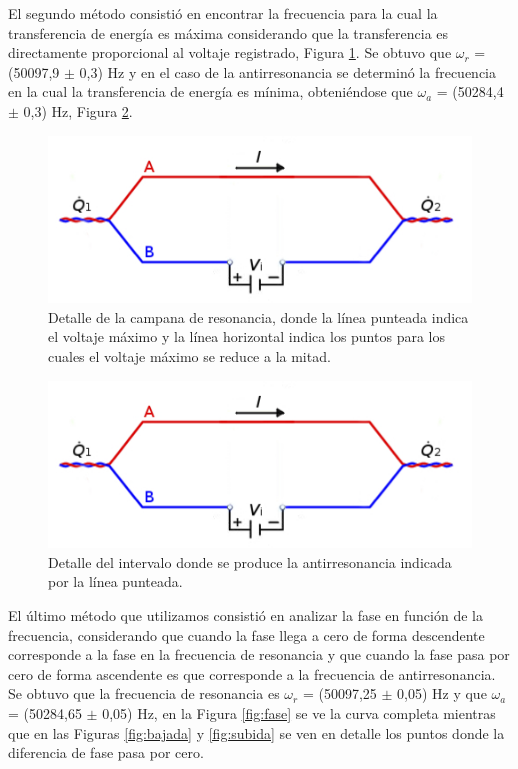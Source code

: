 \documentclass[twoside,twocolumn,a4paper]{article}
\begin{document}
El segundo m\'etodo consisti\'o en encontrar la frecuencia para la cual la transferencia de energ\'ia es m\'axima considerando que la transferencia es directamente proporcional al voltaje registrado,  Figura \ref{fig:detalleRESamp}. Se obtuvo que $\omega_{r}$ = (50097,9 $\pm$ 0,3) Hz y en el caso de la antirresonancia se determin\'o la frecuencia en la cual la transferencia de energ\'ia es m\'inima, obteni\'endose que $\omega_{a}$ = (50284,4 $\pm$ 0,3) Hz, Figura \ref{fig:detalleANTamp}.


\begin{figure}[H]
\includegraphics[width=\linewidth]{peltier.jpg}
\caption{Detalle de la campana de resonancia, donde la l\'inea punteada indica el voltaje m\'aximo y la l\'inea horizontal indica los puntos para los cuales el voltaje m\'aximo se reduce a la mitad.}
\label{fig:detalleRESamp}
\end{figure}


\begin{figure}[H]
\includegraphics[width=\linewidth]{peltier.jpg}
\caption{Detalle del intervalo donde se produce la antirresonancia indicada por la l\'inea punteada.}
\label{fig:detalleANTamp}
\end{figure}

El \'ultimo m\'etodo que utilizamos consisti\'o en analizar la fase en funci\'on de la frecuencia, considerando que cuando la fase llega a cero de forma descendente corresponde a la fase en la frecuencia de resonancia y que cuando la fase pasa por cero de forma ascendente es que corresponde a la frecuencia de antirresonancia. Se obtuvo que la frecuencia de resonancia es $\omega_{r}$ = (50097,25 $\pm$ 0,05) Hz y que $\omega_{a}$ = (50284,65 $\pm$ 0,05) Hz, en la Figura \ref{fig:fase} se ve la curva completa mientras que en las Figuras \ref{fig:bajada} y \ref{fig:subida} se ven en detalle los puntos donde la diferencia de fase pasa por cero. 
\end{document}
